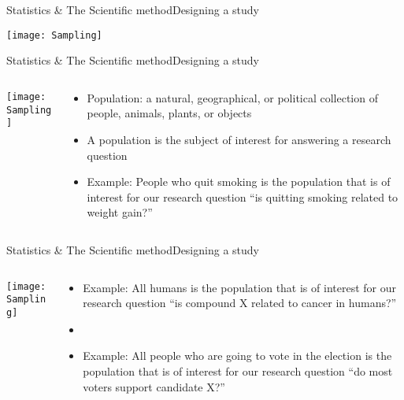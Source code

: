 \documentclass[xcolor=dvipsnames]{beamer}
\begin{document}
\begin{frame}{Statistics \& The Scientific method}{Designing a study}
	\vspace{-12pt}
	\begin{center}
		\texttt{[image: Sampling]}
	\end{center}
\end{frame}

\begin{frame}{Statistics \& The Scientific method}{Designing a study}
	\begin{columns}
		\begin{column}{0.5 \textwidth}
			\texttt{[image: Sampling]}
		\end{column}
		\begin{column}{0.5 \textwidth}
			\begin{itemize}
				\item Population: a natural, geographical, or political collection of people, animals, plants, or objects
				\item A population is the subject of interest for answering a research question
				\item Example: People who quit smoking is the population that is of interest for our research question ``is quitting smoking related to weight gain?''
			\end{itemize}
		\end{column}
	\end{columns}
\end{frame}

\begin{frame}{Statistics \& The Scientific method}{Designing a study}
	\begin{columns}
		\begin{column}{0.5 \textwidth}
			\texttt{[image: Sampling]}
		\end{column}
		\begin{column}{0.5 \textwidth}
			\begin{itemize}
				\item Example: All humans is the population that is of interest for our research question “is compound X related to cancer in humans?”
				\item[]
				\item Example: All people who are going to vote in the election is the population that is of interest for our research question “do most voters support candidate X?”
			\end{itemize}
		\end{column}
	\end{columns}
\end{frame}
\end{document}
